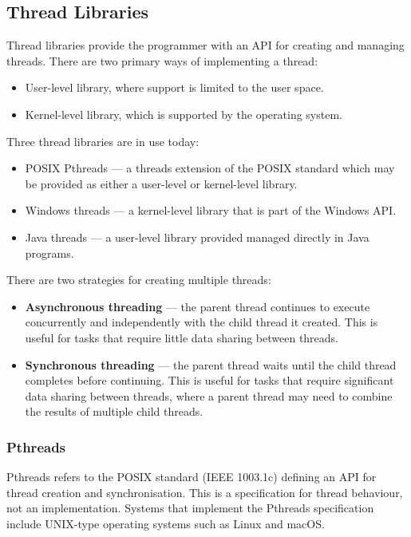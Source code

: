 \documentclass{article}
\begin{document}
\subsection{Thread Libraries}
Thread libraries provide the programmer with an API for creating and
managing threads. There are two primary ways of implementing a thread:
\begin{itemize}
    \item User-level library, where support is limited to the user
          space.
    \item Kernel-level library, which is supported by the operating
          system.
\end{itemize}
Three thread libraries are in use today:
\begin{itemize}
    \item POSIX Pthreads --- a threads extension of the POSIX standard
          which may be provided as either a user-level or kernel-level
          library.
    \item Windows threads --- a kernel-level library that is part of
          the Windows API.\@
    \item Java threads --- a user-level library provided managed
          directly in Java programs.
\end{itemize}
There are two strategies for creating multiple threads:
\begin{itemize}
    \item \textbf{Asynchronous threading} --- the parent thread
          continues to execute concurrently and independently with the
          child thread it created. This is useful for tasks that
          require little data sharing between threads.
    \item \textbf{Synchronous threading} --- the parent thread waits
          until the child thread completes before continuing. This is
          useful for tasks that require significant data sharing
          between threads, where a parent thread may need to combine the
          results of multiple child threads.
\end{itemize}
\subsubsection{Pthreads}
Pthreads refers to the POSIX standard (IEEE 1003.1c) defining an API
for thread creation and synchronisation. This is a specification for
thread behaviour, not an implementation. Systems that implement the
Pthreads specification include UNIX-type operating systems such as
Linux and macOS.\@
\end{document}
